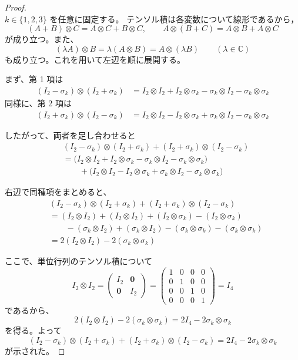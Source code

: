 \documentclass[dvipdfmx,a4paper]{jsarticle}
\theoremstyle{mystyle}
\begin{document}
\begin{proof} 
\ \\
$k\in\{1,2,3\}$ を任意に固定する。
テンソル積は各変数について線形であるから，
\[
(A+B)\otimes C=A\otimes C+B\otimes C,\qquad
A\otimes(B+C)=A\otimes B+A\otimes C
\]
が成り立つ。また、
\[
(\lambda A)\otimes B=\lambda(A\otimes B)=A\otimes(\lambda B)
\qquad
(\lambda\in\mathbb{C})
\]
も成り立つ。これを用いて左辺を順に展開する。

\medskip
\noindent
まず、第 1 項は
\begin{align*}
(I_2-\sigma_k)\otimes(I_2+\sigma_k)
&=
I_2\otimes I_2+I_2\otimes\sigma_k-\sigma_k\otimes I_2-\sigma_k\otimes\sigma_k
\end{align*}
同様に、第 2 項は
\begin{align*}
(I_2+\sigma_k)\otimes(I_2-\sigma_k)
&=
I_2\otimes I_2-I_2\otimes\sigma_k+\sigma_k\otimes I_2-\sigma_k\otimes\sigma_k
\end{align*}

\medskip
\noindent
したがって、両者を足し合わせると
\begin{align*}
&(I_2-\sigma_k)\otimes(I_2+\sigma_k)+(I_2+\sigma_k)\otimes(I_2-\sigma_k)\\
&=
\bigl(I_2\otimes I_2+I_2\otimes\sigma_k-\sigma_k\otimes I_2-\sigma_k\otimes\sigma_k\bigr)\\
&\qquad
+\bigl(I_2\otimes I_2-I_2\otimes\sigma_k+\sigma_k\otimes I_2-\sigma_k\otimes\sigma_k\bigr)
\end{align*}

\medskip
\noindent
右辺で同種項をまとめると、
\begin{align*}
&(I_2-\sigma_k)\otimes(I_2+\sigma_k)+(I_2+\sigma_k)\otimes(I_2-\sigma_k)\\
&=
(I_2\otimes I_2)+(I_2\otimes I_2)
+(I_2\otimes\sigma_k)-(I_2\otimes\sigma_k)\\
&\qquad
-(\sigma_k\otimes I_2)+(\sigma_k\otimes I_2)
-(\sigma_k\otimes\sigma_k)-(\sigma_k\otimes\sigma_k)\\
&=
2(I_2\otimes I_2)-2(\sigma_k\otimes\sigma_k)
\end{align*}

\medskip
\noindent
ここで、単位行列のテンソル積について
\[
I_2\otimes I_2=
\begin{pmatrix}
I_2 & \mathbf{0}\\
\mathbf{0} & I_2
\end{pmatrix}
=
\begin{pmatrix}
1 & 0 & 0 & 0\\
0 & 1 & 0 & 0\\
0 & 0 & 1 & 0\\
0 & 0 & 0 & 1
\end{pmatrix}
=I_4
\]
であるから、
\[
2(I_2\otimes I_2)-2(\sigma_k\otimes\sigma_k)
=
2I_4-2\sigma_k\otimes\sigma_k
\]
を得る。よって
\[
(I_2-\sigma_{k})\otimes(I_2+\sigma_{k})+(I_2+\sigma_{k})\otimes (I_2-\sigma_{k})=2I_4-2\sigma_{k}\otimes\sigma_{k}
\]
が示された。


\end{proof}
\end{document}
